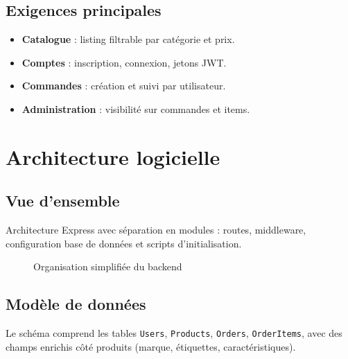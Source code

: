 \documentclass[12pt,a4paper]{report}
\begin{document}
\section{Exigences principales}
\begin{itemize}
  \item \textbf{Catalogue} : listing filtrable par catégorie et prix.
  \item \textbf{Comptes} : inscription, connexion, jetons JWT.
  \item \textbf{Commandes} : création et suivi par utilisateur.
  \item \textbf{Administration} : visibilité sur commandes et items.
\end{itemize}

\chapter{Architecture logicielle}
\section{Vue d'ensemble}
Architecture Express avec séparation en modules : routes, middleware, configuration base de données et scripts d'initialisation.

\begin{figure}[H]
  \centering
  \caption{Organisation simplifiée du backend}
\end{figure}

\section{Modèle de données}
Le schéma comprend les tables \texttt{Users}, \texttt{Products}, \texttt{Orders}, \texttt{OrderItems}, avec des champs enrichis côté produits (marque, étiquettes, caractéristiques).
\end{document}
